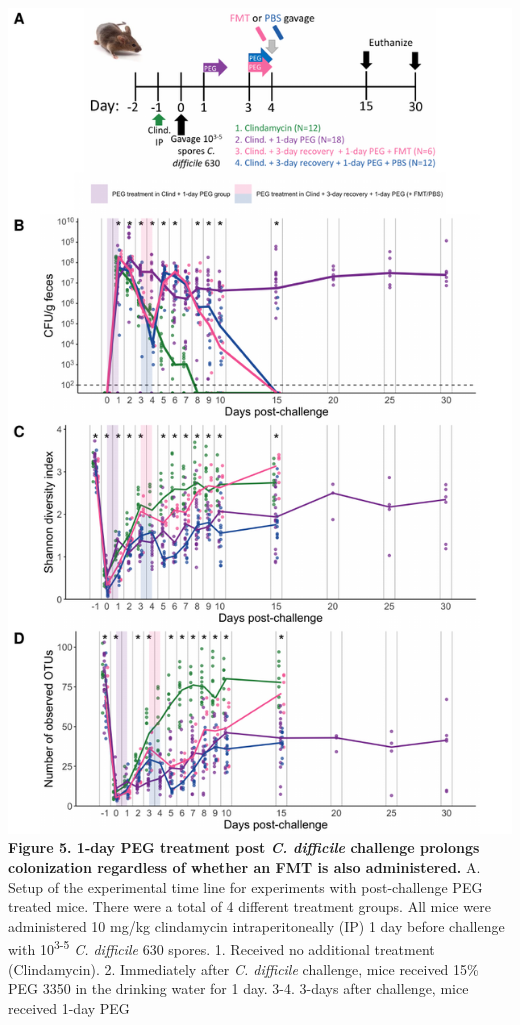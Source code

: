 \documentclass[
  11pt,
]{article}
\begin{document}
\includegraphics{figure_5.pdf} \textbf{Figure 5. 1-day PEG treatment
post \emph{C. difficile} challenge prolongs colonization regardless of
whether an FMT is also administered.} A. Setup of the experimental time
line for experiments with post-challenge PEG treated mice. There were a
total of 4 different treatment groups. All mice were administered 10
mg/kg clindamycin intraperitoneally (IP) 1 day before challenge with
10\textsuperscript{3-5} \emph{C. difficile} 630 spores. 1. Received no
additional treatment (Clindamycin). 2. Immediately after \emph{C.
difficile} challenge, mice received 15\% PEG 3350 in the drinking water
for 1 day. 3-4. 3-days after challenge, mice received 1-day PEG
\end{document}
